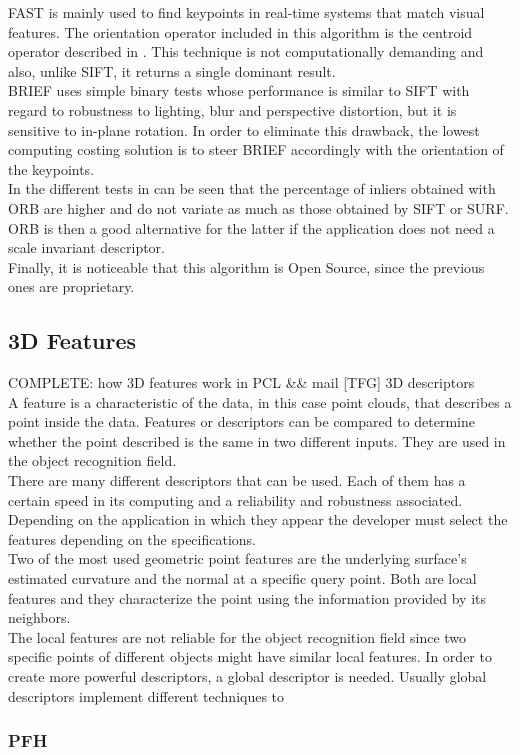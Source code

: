 FAST is mainly used to find keypoints in real-time systems that match visual features. The orientation operator included in this algorithm is the centroid operator described in \cite{orientation_corners}. This technique is not computationally demanding and also, unlike SIFT, it returns a single dominant result. 
\\

BRIEF uses simple binary tests whose performance is similar to SIFT with regard to robustness to lighting, blur and perspective distortion, but it is sensitive to in-plane rotation. In order to eliminate this drawback, the lowest computing costing solution is to steer BRIEF accordingly with the orientation of the keypoints. 
\\

In the different tests in \cite{orb} can be seen that the percentage of inliers obtained with ORB are higher and do not variate as much as those obtained by SIFT or SURF. 
ORB is then a good alternative for the latter if the application does not need a scale invariant descriptor. 
\\

Finally, it is noticeable that this algorithm is Open Source, since the previous ones are proprietary. 


\subsection{3D Features}
\label{3d_features}

COMPLETE: how 3D features work in PCL  &&  mail [TFG] 3D descriptors
\\

A feature is a characteristic of the data, in this case point clouds, that describes a point inside the data. Features or descriptors can be compared to determine whether the point described is the same in two different inputs. They are used in the object recognition field. 
\\

There are many different descriptors that can be used. Each of them has a certain speed in its computing and a reliability and robustness associated. Depending on the application in which they appear the developer must select the features depending on the specifications. 
\\

Two of the most used geometric point features are the underlying surface's estimated curvature and the normal at a specific query point. Both are local features and they characterize the point using the information provided by its neighbors. \\

The local features are not reliable for the object recognition field since two specific points of different objects might have similar local features. In order to create more powerful descriptors, a global descriptor is needed. Usually global descriptors implement different techniques to 


\subsubsection{PFH}
\label{pfh}
